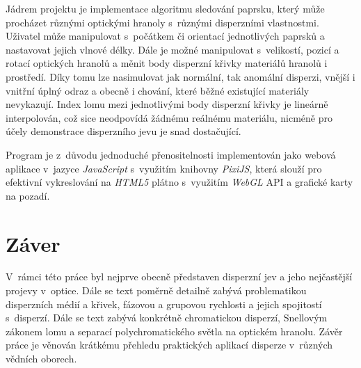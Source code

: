 Jádrem projektu je implementace algoritmu
sledování paprsku, který může procházet
různými optickými hranoly s~různými disperzními
vlastnostmi. Uživatel může manipulovat
s~počátkem či orientací jednotlivých paprsků
a nastavovat jejich vlnové délky. Dále
je možné manipulovat s~velikostí, pozicí
a rotací optických hranolů a
měnit body disperzní křivky materiálů
hranolů i prostředí.
Díky tomu lze nasimulovat jak normální,
tak anomální disperzi, vnější i vnitřní
úplný odraz a obecně i chování, které
běžné existující materiály nevykazují.
Index lomu mezi jednotlivými body disperzní
křivky je lineárně interpolován, což sice
neodpovídá žádnému reálnému materiálu,
nicméně pro účely demonstrace disperzního
jevu je snad dostačující.

Program je z~důvodu jednoduché přenositelnosti
implementován jako webová aplikace v~jazyce
\textit{JavaScript} s~využitím knihovny
\textit{PixiJS}, která slouží pro efektivní
vykreslování na \textit{HTML5} plátno s~využitím \textit{WebGL} API a grafické karty na pozadí.

\section{Záver}
V~rámci této práce byl nejprve obecně
představen disperzní jev a jeho nejčastější
projevy v~optice. Dále se text poměrně
detailně zabývá problematikou disperzních
médií a křivek, fázovou a grupovou rychlosti
a jejich spojitostí s~disperzí. Dále se
text zabývá konkrétně chromatickou
disperzí, Snellovým zákonem lomu a separací
polychromatického světla na optickém hranolu.
Závěr práce je věnován krátkému přehledu
praktických aplikací disperze v~různých vědních
oborech.
